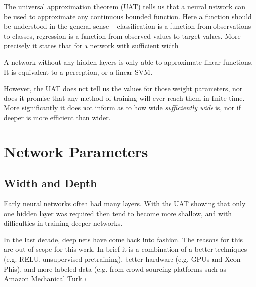 \documentclass[12pt,parskip]{komatufte}
\begin{document}
The universal approximation theorem (UAT) tells us that a neural network can be used to approximate any continuous bounded function.
Here a function should be understood in the general sense -- classification is a function from observations to classes, regression is a function from observed values to target values.
More precisely it states that for a network with sufficient width

A network without any hidden layers is only able to approximate linear functions.
It is equivalent to a perception, or a linear SVM. 


However, the UAT does not tell us the values for those weight parameters,
nor does it promise that any method of training will ever reach them in finite time.
More significantly it does not inform as to how wide \emph{sufficiently wide} is,
nor if deeper is more efficient than wider.


\section{Network Parameters}

\subsection{Width and Depth}


Early neural networks often had many layers.
With the UAT showing that only one hidden layer was required then tend to become more shallow, and
with difficulties in training deeper networks.

In the last decade, deep nets have come back into fashion.
The reasons for this are out of scope for this work.
In brief it is a combination of a better techniques (e.g. RELU, unsupervised pretraining),
better hardware (e.g. GPUs and Xeon Phis), and more labeled data (e.g. from crowd-sourcing platforms such as Amazon Mechanical Turk.)
\end{document}
